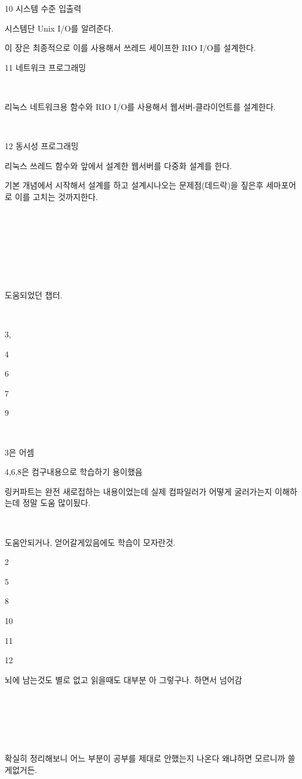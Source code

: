 10 시스템 수준 입출력

시스템단 Unix I/O를 알려준다.

이 장은 최종적으로 이를 사용해서 쓰레드 세이프한 RIO I/O를 설계한다. 

11 네트워크 프로그래밍

​

리눅스 네트워크용 함수와 RIO I/O를 사용해서 웹서버-클라이언트를 설계한다.

​

12 동시성 프로그래밍

리눅스 쓰레드 함수와 앞에서 설계한 웹서버를 다중화 설계를 한다.

기본 개념에서 시작해서 설계를 하고 설계시나오는 문제점(데드락)을 짚은후 세마포어로 이를 고치는 것까지한다.

​

​

​

​

도움되었던 챕터. 

​

3,

4

6

7

9

​

3은 어셈

4,6,8은 컴구내용으로 학습하기 용이했음

링커파트는 완전 새로접하는 내용이었는데 실제 컴파일러가 어떻게 굴러가는지 이해하는데 정말 도움 많이됬다.

​

도움안되거나, 얻어갈게있음에도 학습이 모자란것.

2

5

8

10

11

12

뇌에 남는것도 별로 없고 읽을때도 대부분 아 그렇구나. 하면서 넘어감

​

​

​

확실히 정리해보니 어느 부분이 공부를 제대로 안했는지 나온다 왜냐하면 모르니까 쓸게없거든.
